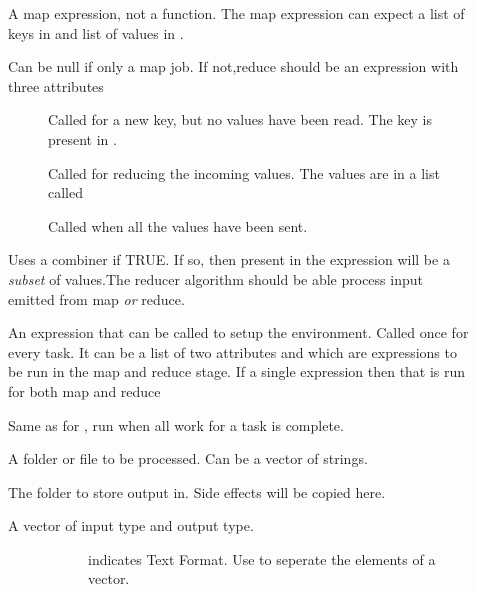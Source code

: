 \documentclass[letterpaper,10pt,english]{sphinxmanual}
\begin{document}
\begin{description}
\item[{}] \leavevmode
A map expression, not a function. The map expression can expect a list of keys in  and list of values in .

\item[{}] \leavevmode
Can be null if only a map job. If not,reduce should be an expression with three attributes
\begin{description}
\item[{}] \leavevmode
Called for a new key, but no values have been read. The key is present in .

\item[{}] \leavevmode
Called for reducing the incoming values. The values are in a list called 

\item[{}] \leavevmode
Called when all the values have been sent.

\end{description}

\item[{}] \leavevmode
Uses a combiner if TRUE. If so, then  present in the  expression will be a \emph{subset} of values.The reducer algorithm should be able process input emitted from map \emph{or} reduce.

\item[{}] \leavevmode
An expression that can be called to setup the environment. Called once for every task.
It can be a list of two attributes  and  which are expressions to be run in the map and reduce stage. If a single expression then that is run for both map and reduce

\item[{}] \leavevmode
Same as for , run when all work for a task is complete.

\item[{}] \leavevmode
A folder or file to be processed. Can be a vector of strings.

\item[{}] \leavevmode
The folder to store output in. Side effects will be copied here.

\item[{}] \leavevmode\begin{description}
\item[{A vector of input type and output type.}] \leavevmode\begin{description}
\item[{}] \leavevmode
indicates Text Format. Use  to seperate the elements of a vector.


\end{description}
\end{description}
\end{description}
\end{document}
